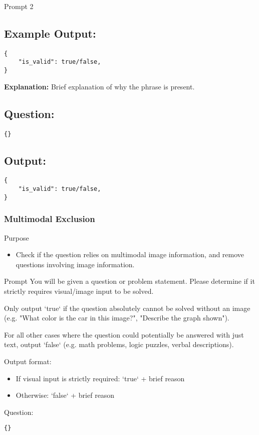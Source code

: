 \begin{promptbox}{Prompt 2}
\subsection*{Example Output:}
\begin{verbatim}
{
    "is_valid": true/false,
}
\end{verbatim}
\textbf{Explanation:} Brief explanation of why the phrase is present.

\subsection*{Question:}
\begin{verbatim}
{}
\end{verbatim}

\subsection*{Output:}
\begin{verbatim}
{
    "is_valid": true/false,
}
\end{verbatim}

\end{promptbox}

\subsubsection{Multimodal Exclusion}
\begin{purposebox}{Purpose}
\begin{itemize}
    \item Check if the question relies on multimodal image information, and remove questions involving image information.
\end{itemize}
\end{purposebox}

\begin{promptbox}{Prompt}
You will be given a question or problem statement. Please determine if it strictly requires visual/image input to be solved.

\vspace{0.5em}  
Only output `true` if the question absolutely cannot be solved without an image (e.g. "What color is the car in this image?", "Describe the graph shown").

\vspace{0.5em}  
For all other cases where the question could potentially be answered with just text, output `false` (e.g. math problems, logic puzzles, verbal descriptions).

\vspace{0.5em}  
Output format:
\begin{itemize}
\item If visual input is strictly required: `true` + brief reason
\item Otherwise: `false` + brief reason
\end{itemize}

Question:
\begin{verbatim}
{}
\end{verbatim}
\end{promptbox}

